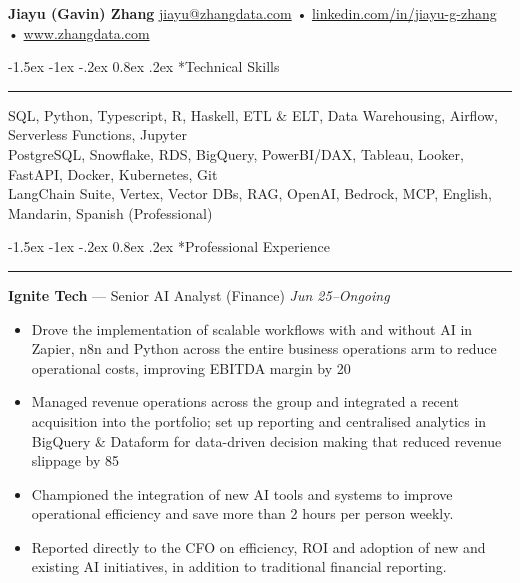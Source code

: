 \documentclass[10pt,letterpaper]{article}
\makeatletter
\renewcommand{\section}{\@startsection{section}{1}{\z@}%
  {-1.5ex \@plus -1ex \@minus -.2ex}%
  {0.8ex \@plus.2ex}%
  {\normalfont\large\bfseries}}
\newcommand{\name}{Jiayu (Gavin) Zhang}
\newcommand{\emailaddr}{jiayu@zhangdata.com}
\newcommand{\linkedin}{https://www.linkedin.com/in/jiayu-g-zhang}
\newcommand{\website}{https://www.zhangdata.com}
\makeatother
\begin{document}
\begin{center}
  {\LARGE\bfseries \name} \href{mailto:\emailaddr}{\emailaddr} • \href{\linkedin}{linkedin.com/in/jiayu-g-zhang} • \href{\website}{www.zhangdata.com}
\end{center}

\section*{Technical Skills}
\hrule\vspace{0.3em}
SQL, Python, Typescript, R, Haskell, ETL \& ELT, Data Warehousing, Airflow, Serverless Functions, Jupyter\\
PostgreSQL, Snowflake, RDS, BigQuery, PowerBI/DAX, Tableau, Looker, FastAPI, Docker, Kubernetes, Git\\
LangChain Suite, Vertex, Vector DBs, RAG, OpenAI, Bedrock, MCP, English, Mandarin, Spanish (Professional)

\section*{Professional Experience}
\hrule\vspace{0.3em}

\textbf{Ignite Tech} — Senior AI Analyst (Finance) \hfill \textit{Jun 25--Ongoing}\vspace{-0.2em}
\begin{itemize}
  \item Drove the implementation of scalable workflows with and without AI in Zapier, n8n and Python across the entire business operations arm to reduce operational costs, improving EBITDA margin by 20%
  \item Managed revenue operations across the group and integrated a recent acquisition into the portfolio; set up reporting and centralised analytics in BigQuery \& Dataform for data-driven decision making that reduced revenue slippage by 85%
  \item Championed the integration of new AI tools and systems to improve operational efficiency and save more than 2 hours per person weekly.
  \item Reported directly to the CFO on efficiency, ROI and adoption of new and existing AI initiatives, in addition to traditional financial reporting.
\end{itemize}
\end{document}
